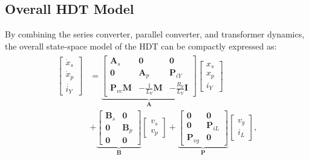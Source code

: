 \subsection{Overall HDT Model}

By combining the series converter, parallel converter, and transformer dynamics, the overall state-space model of the HDT can be compactly expressed as:
\begin{align}
    \begin{aligned}
        \begin{bmatrix}
            \dot{x}_s\\[2pt]
            \dot{x}_p\\[2pt]
            \dot{i_Y}
        \end{bmatrix}
        &=
        \underbrace{\begin{bmatrix}
            \mathbf{A}_s & \mathbf{0} & \mathbf{0}\\[4pt]
            \mathbf{0} & \mathbf{A}_p & \mathbf{P}_{iY}\\[4pt]
            \mathbf{P}_{vc}\mathbf{M} & -\tfrac{1}{L_Y}\mathbf{M} & -\tfrac{R_Y}{L_Y}\mathbf{I}
        \end{bmatrix}}_{\mathbf{A}}
        \begin{bmatrix}
            x_s\\[2pt]
            x_p\\[2pt]
            i_Y
        \end{bmatrix}
        \\
        &+
        \underbrace{\begin{bmatrix}
            \mathbf{B}_s & \mathbf{0}\\[4pt]
            \mathbf{0} & \mathbf{B}_p\\[4pt]
            \mathbf{0} & \mathbf{0}
        \end{bmatrix}}_{\mathbf{B}}
        \begin{bmatrix}
            v_s\\[2pt]
            v_p
        \end{bmatrix} \nonumber
        +
        \underbrace{\begin{bmatrix}
            \mathbf{0} & \mathbf{0}\\[4pt]
            \mathbf{0} & \mathbf{P}_{iL}\\[4pt]
            \mathbf{P}_{vg} & \mathbf{0}
        \end{bmatrix}}_{\mathbf{P}}
        \begin{bmatrix}
            v_g\\[2pt]
            i_L
        \end{bmatrix},
        \label{eq:HDT_compact}
    \end{aligned}
\end{align}
